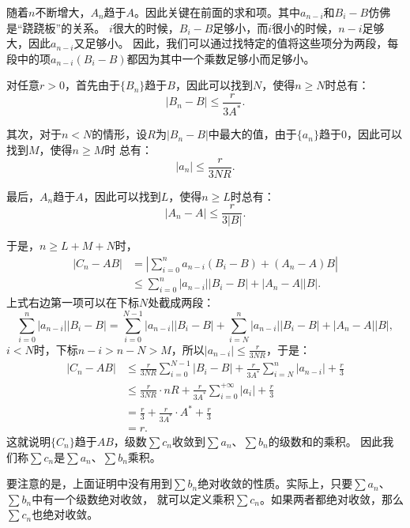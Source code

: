 \documentclass[12pt,UTF8]{ctexbook}
\begin{document}
随着$n$不断增大，$A_n$趋于$A$。因此关键在前面的求和项。其中$a_{n-i}$和$B_i - B$仿佛是“跷跷板”的关系。
$i$很大的时候，$B_i - B$足够小，而$i$很小的时候，$n-i$足够大，因此$a_{n-i}$又足够小。
因此，我们可以通过找特定的值将这些项分为两段，每段中的项$a_{n-i} (B_i - B)$都因为其中一个乘数足够小而足够小。

对任意$r>0$，首先由于$\{B_n\}$趋于$B$，因此可以找到$N$，使得$n\geqslant N$时总有：
$$ |B_n - B| \leqslant \frac{r}{3A^*}. $$

其次，对于$n<N$的情形，设$R$为$|B_n-B|$中最大的值，由于$\{a_n\}$趋于$0$，因此可以找到$M$，使得$n\geqslant M$时
总有：
$$ |a_n| \leqslant \frac{r}{3NR}.$$

最后，$A_n$趋于$A$，因此可以找到$L$，使得$n\geqslant L$时总有：
$$ |A_n - A| \leqslant \frac{r}{3|B|}.$$

于是，$n\geqslant L+M+N$时，
\begin{align*}
    |C_n - AB| &= \left|\sum_{i=0}^{n} a_{n-i} (B_i - B) + (A_n - A) B \right| \\
    &\leqslant  \sum_{i=0}^{n} |a_{n-i} ||B_i - B | + |A_n - A| |B|. 
\end{align*}
上式右边第一项可以在下标$N$处截成两段：
$$ \sum_{i=0}^{n} |a_{n-i} ||B_i - B | = \sum_{i=0}^{N-1} |a_{n-i}| |B_i - B| + \sum_{i=N}^{n} |a_{n-i}| |B_i - B| + |A_n - A| |B|,$$
$i<N$时，下标$n-i > n-N >M$，所以$|a_{n-i}| \leqslant \frac{r}{3NR}$，于是：
\begin{align*}
    |C_n - AB| &\leqslant \frac{r}{3NR} \sum_{i=0}^{N-1} |B_i - B| + \frac{r}{3A^*} \sum_{i=N}^{n} |a_{n-i}| + \frac{r}{3} \\
    &\leqslant \frac{r}{3NR} \cdot nR +  \frac{r}{3A^*} \sum_{i=0}^{+\infty} |a_i| + \frac{r}{3} \\
    &= \frac{r}{3} + \frac{r}{3A^*}\cdot A^* + \frac{r}{3} \\
    &= r.
\end{align*}
这就说明$\{C_n\}$趋于$AB$，级数$\sum c_n$收敛到$\sum a_n$、$\sum b_n$的级数和的乘积。
因此我们称$\sum c_n$是$\sum a_n$、$\sum b_n$乘积。

要注意的是，上面证明中没有用到$\sum b_n$绝对收敛的性质。实际上，只要$\sum a_n$、$\sum b_n$中有一个级数绝对收敛，
就可以定义乘积$\sum c_n$。如果两者都绝对收敛，那么$\sum c_n$也绝对收敛。

\end{document}
